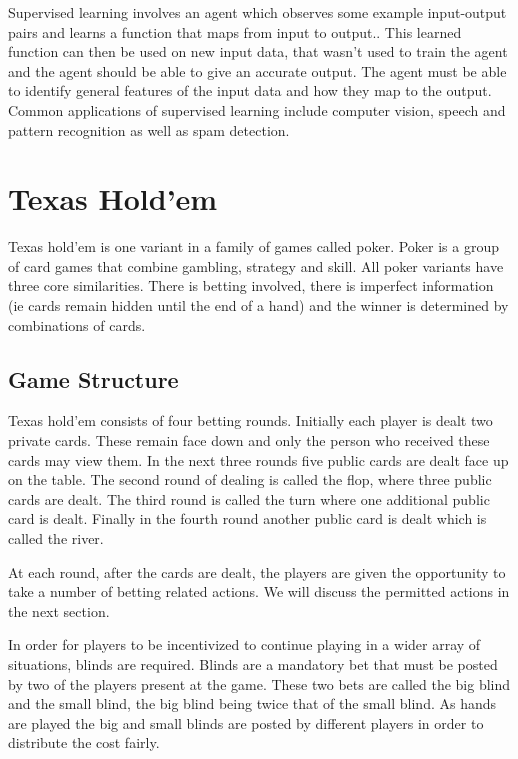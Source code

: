 Supervised learning involves an agent which observes some example input-output pairs and learns
a function that maps from input to output.\citep{russell2016artificial}.
This learned function can then be used on new input data, that wasn't used to train the agent and the
agent should be able to give an accurate output.
The agent must be able to identify general features of the input data and how they map to the output.
Common applications of supervised learning include computer vision, speech and pattern recognition as well as
spam detection.

\section{Texas Hold'em}\label{sec:thIntro}
Texas hold'em is one variant in a family of games called poker.
Poker is a group of card games that combine gambling, strategy and skill.
All poker variants have three core similarities.
There is betting involved, there is imperfect information (ie cards remain hidden until the end of a hand)
and the winner is determined by combinations of cards.

\subsection{Game Structure}\label{subsec:bettingRounds}
Texas hold'em consists of four betting rounds.
Initially each player is dealt two private cards.
These remain face down and only the person who received these cards may view them.
In the next three rounds five public cards are dealt face up on the table.
The second round of dealing is called the flop, where three public cards are dealt.
The third round is called the turn where one additional public card is dealt.
Finally in the fourth round another public card is dealt which is called the river.

At each round, after the cards are dealt, the players are given the opportunity to take a number of betting
related actions.
We will discuss the permitted actions in the next section.

In order for players to be incentivized to continue playing in a wider array of situations, blinds are required.
Blinds are a mandatory bet that must be posted by two of the players present at the game.
These two bets are called the big blind and the small blind, the big blind being twice that of the small blind.
As hands are played the big and small blinds are posted by different players in order to distribute the cost fairly.

